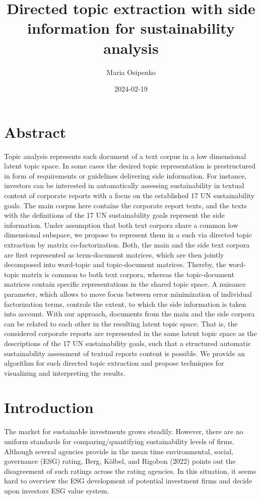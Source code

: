 \documentclass[
]{article}
\title{Directed topic extraction with side information for sustainability analysis}
\author{Maria Osipenko}
\date{2024-02-19}
\begin{document}
\maketitle

\hypertarget{abstract}{%
\section{Abstract}\label{abstract}}

Topic analysis represents each document of a text corpus in a low dimensional latent topic space. In some cases the desired topic representation is prestructured in form of requirements or guidelines delivering side information. For instance, investors can be interested in automatically assessing sustainability in textual content of corporate reports with a focus on the established 17 UN sustainability goals. The main corpus here contains the corporate report texts, and the texts with the definitions of the 17 UN sustainability goals represent the side information. Under assumption that both text corpora share a common low dimensional subspace, we propose to represent them in a such via directed topic extraction by matrix co-factorization. Both, the main and the side text corpora are first represented as term-document matrices, which are then jointly decomposed into word-topic and topic-document matrices. Thereby, the word-topic matrix is common to both text corpora, whereas the topic-document matrices contain specific representations in the shared topic space. A nuisance parameter, which allows to move focus between error minimization of individual factorization terms, controls the extent, to which the side information is taken into account. With our approach, documents from the main and the side corpora can be related to each other in the resulting latent topic space. That is, the considered corporate reports are represented in the same latent topic space as the descriptions of the 17 UN sustainability goals, such that a structured automatic sustainability assessment of textual reports content is possible. We provide an algorithm for such directed topic extraction and propose techniques for visualizing and interpreting the results.

\hypertarget{introduction}{%
\section{Introduction}\label{introduction}}

The market for sustainable investments grows steadily. However, there are no uniform standards for comparing/quantifying sustainability levels of firms. Although several agencies provide in the mean time environmental, social, governance (ESG) rating, Berg, Kölbel, and Rigobon (2022) points out the disagreement of such ratings across the rating agencies. In this situation, it seems hard to overview the ESG development of potential investment firms and decide upon investors ESG value system.
\end{document}
